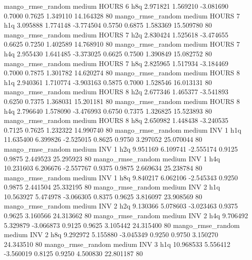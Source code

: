 mango_rmse_random     medium    HOURS                 6                  h8q  2.971821 1.569210 -3.081690 0.7000 0.7625  1.349110   14.164328 80
mango_rmse_random     medium    HOURS                 7                  h1q  3.095888 1.774148 -3.774504 0.5750 0.6875  1.583369   15.509780 80
mango_rmse_random     medium    HOURS                 7                  h2q  2.830424 1.525618 -3.474655 0.6625 0.7250  1.402589   14.768910 80
mango_rmse_random     medium    HOURS                 7                  h4q  2.955430 1.641485 -3.373025 0.6625 0.7500  1.390849   15.082752 80
mango_rmse_random     medium    HOURS                 7                  h8q  2.825965 1.517934 -3.184469 0.7000 0.7875  1.301782   14.620274 80
mango_rmse_random     medium    HOURS                 8                  h1q  2.940361 1.710774 -3.903163 0.5875 0.7000  1.528546   16.013131 80
mango_rmse_random     medium    HOURS                 8                  h2q  2.677346 1.465377 -3.541893 0.6250 0.7375  1.368031   15.201181 80
mango_rmse_random     medium    HOURS                 8                  h4q  2.796640 1.578090 -3.476993 0.6750 0.7375  1.326825   15.523893 80
mango_rmse_random     medium    HOURS                 8                  h8q  2.650982 1.448438 -3.240535 0.7125 0.7625  1.232322   14.990740 80
mango_rmse_random     medium      INV                 1                  h1q 11.635400 6.399826 -2.525015 0.8625 0.9750  3.297052   25.070044 80
mango_rmse_random     medium      INV                 1                  h2q  9.951169 6.109741 -2.555174 0.9125 0.9875  2.449523   25.295923 80
mango_rmse_random     medium      INV                 1                  h4q 10.231603 6.206676 -2.557767 0.9375 0.9875  2.669634   25.238784 80
mango_rmse_random     medium      INV                 1                  h8q  9.840217 6.062106 -2.545343 0.9250 0.9875  2.441504   25.332195 80
mango_rmse_random     medium      INV                 2                  h1q 10.563927 5.474978 -3.066305 0.8375 0.9625  3.816097   23.908569 80
mango_rmse_random     medium      INV                 2                  h2q  9.130366 5.078603 -3.023463 0.9375 0.9625  3.160566   24.313662 80
mango_rmse_random     medium      INV                 2                  h4q  9.706492 5.329879 -3.066873 0.9125 0.9625  3.105442   24.315400 80
mango_rmse_random     medium      INV                 2                  h8q  9.292972 5.155880 -3.045349 0.9250 0.9750  3.150270   24.343510 80
mango_rmse_random     medium      INV                 3                  h1q 10.968533 5.556412 -3.560019 0.8125 0.9250  4.500830   22.801187 80
